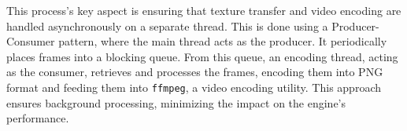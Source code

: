 This process's key aspect is ensuring that texture transfer and video encoding are handled asynchronously on a separate thread. This is done using a Producer-Consumer pattern, where the main thread acts as the producer. It periodically places frames into a blocking queue. From this queue, an encoding thread, acting as the consumer, retrieves and processes the frames, encoding them into PNG format and feeding them into \verb|ffmpeg|, a video encoding utility. This approach ensures background processing, minimizing the impact on the engine's performance.



